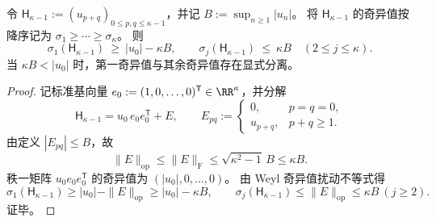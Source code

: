 \begin{theorem}\label{thm:xi-hankel-spike-singular-spectrum-separation}
令 \(\mathsf H_{\kappa-1}:=(u_{p+q})_{0\le p,q\le \kappa-1}\)，并记 \(B:=\sup_{n\ge 1}|u_n|\)。
将 \(\mathsf H_{\kappa-1}\) 的奇异值按降序记为 \(\sigma_1\ge\cdots\ge\sigma_\kappa\)。
则
\[
\sigma_1(\mathsf H_{\kappa-1})\ \ge\ |u_0|-\kappa B,
\qquad
\sigma_j(\mathsf H_{\kappa-1})\ \le\ \kappa B\quad(2\le j\le \kappa).
\]
当 \(\kappa B<|u_0|\) 时，第一奇异值与其余奇异值存在显式分离。
\end{theorem}
\begin{proof}
记标准基向量 \(e_0:=(1,0,\dots,0)^{\mathsf T}\in\RR^{\kappa}\)，并分解
\[
\mathsf H_{\kappa-1}=u_0\,e_0e_0^{\mathsf T}+E,
\qquad
E_{pq}:=\begin{cases}
0,&p=q=0,\\
u_{p+q},&p+q\ge 1.
\end{cases}
\]
由定义 \(|E_{pq}|\le B\)，故
\[
\|E\|_{\mathrm{op}}
\le
\|E\|_{\mathrm{F}}
\le
\sqrt{\kappa^2-1}\,B
\le
\kappa B.
\]
秩一矩阵 \(u_0e_0e_0^{\mathsf T}\) 的奇异值为 \((|u_0|,0,\dots,0)\)。
由 Weyl 奇异值扰动不等式得
\[
\sigma_1(\mathsf H_{\kappa-1})\ge |u_0|-\|E\|_{\mathrm{op}}\ge |u_0|-\kappa B,
\qquad
\sigma_j(\mathsf H_{\kappa-1})\le \|E\|_{\mathrm{op}}\le \kappa B\ (j\ge 2).
\]
证毕。
\end{proof}

